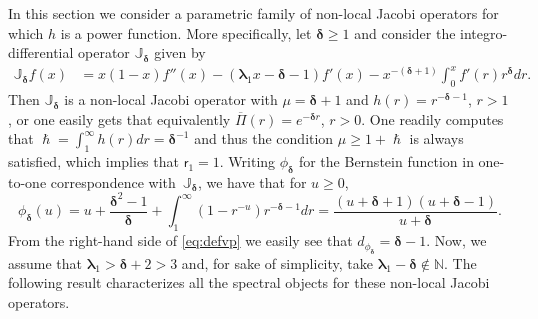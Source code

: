 \documentclass[10pt]{amsart}
\theoremstyle{plain}
\theoremstyle{definition}
\newcommand{\N}{\mathbb{N}}
\newcommand{\calJ}{\mathds{J}}
\newcommand{\lam}{{\bm{\lambda}_1}}
\newcommand{\vat}{{\mathsf{r}_1}}
\newcommand{\mm}{{\bm{\delta}}}
\let\h\hslash
\let\mo\mu
\begin{document}
In this section we consider a parametric family of non-local Jacobi operators for which $h$ is a power function. More specifically, let $\mm \geq 1$ and consider the integro-differential operator $\calJ_\mm$ given by
\begin{align*}
\calJ_{\mm} f(x) &= x(1-x)f''(x) - (\lam x - \mm-1)f'(x)- x^{-(\mm+1)}\int_0^{x} f'(r)r^{\mm}dr.
\end{align*}
Then $\calJ_\mm$ is a non-local Jacobi operator with $\mo = \mm+1$ and $h(r) = r^{-\mm-1}$, $r>1$, or one easily gets that equivalently $\overline{\Pi}(r) = e^{-\mm r}$, $r > 0$. One readily computes that $\h = \int_1^\infty h(r)dr = \mm^{-1}$ and thus the condition $\mo \geq 1+\h$ is always satisfied, which implies that $\vat = 1$. Writing $\phi_\mm$ for the Bernstein function in one-to-one correspondence with~$\calJ_\mm$, we have that for $u \geq 0$,
\begin{equation}
\label{eq:defvp}
\phi_{\mm}(u) = u + \frac{\mm^2-1}{\mm} + \int_1^\infty (1-r^{-u})r^{-\mm-1}dr = \frac{(u+\mm+1)(u+\mm-1)}{u + \mm}.\end{equation}
From the right-hand side of \eqref{eq:defvp} we easily see that $d_{\phi_\mm} = \mm-1$. Now, we assume that $\lam >\mm+2 > 3$ and, for sake of simplicity, take $\lam - \mm \not\in \N$. The following result characterizes all the spectral objects for these non-local Jacobi operators.
\end{document}

